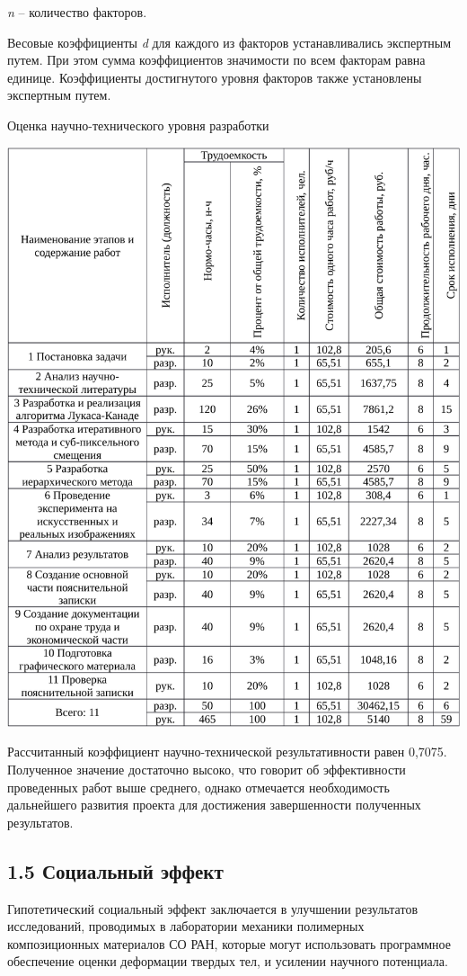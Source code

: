 

\textit{n} – количество факторов.

Весовые коэффициенты \textit{d} для каждого из факторов устанавливались экспертным путем. При этом сумма коэффициентов значимости по всем факторам равна единице. Коэффициенты достигнутого уровня факторов также установлены экспертным путем.

\begin{table}[!ht]
\caption{Оценка научно-технического уровня разработки}
\centering
\includegraphics[page=10, width=1\linewidth]{econom_table.pdf}
\label{tab:eco_10}
\end{table}
Рассчитанный коэффициент научно-технической результативности равен 0,7075. Полученное значение достаточно высоко, что говорит об эффективности проведенных работ выше среднего, однако отмечается необходимость дальнейшего развития проекта для достижения завершенности полученных результатов.

\subsection{1.5 Социальный эффект}
Гипотетический социальный эффект заключается в улучшении результатов исследований, проводимых в лаборатории механики полимерных композиционных материалов СО РАН, которые могут использовать программное обеспечение оценки деформации твердых тел, и усилении научного потенциала.
